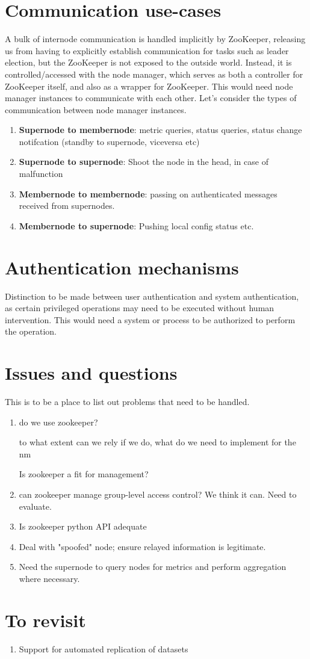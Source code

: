 \documentclass[oneside,12pt]{memoir}
\begin{document}
\section{Communication use-cases}
\label{commcases}
A bulk of internode communication is handled implicitly by ZooKeeper, releasing us from having to explicitly establish communication for tasks such as leader election, but the ZooKeeper is not exposed to the outside world. Instead, it is controlled/accessed with the node manager, which serves as both a controller for ZooKeeper itself, and also as a wrapper for ZooKeeper. This would need node manager instances to communicate with each other. Let's consider the types of communication between node manager instances.
\begin{enumerate}
\item \textbf{Supernode to membernode}: metric queries, status queries, status change notifcation (standby to supernode, viceversa etc)
\item \textbf{Supernode to supernode}: Shoot the node in the head, in case of malfunction
\item \textbf{Membernode to membernode}: passing on authenticated messages received from supernodes.
\item \textbf{Membernode to supernode}: Pushing local config status etc.
\end{enumerate}

\section{Authentication mechanisms}
Distinction to be made between user authentication and system authentication, as certain privileged operations may need to be executed without human intervention. This would need a system or process to be authorized to perform the operation. 
\section{Issues and questions}
This is to be a place to list out problems that need to be handled.
\begin{enumerate}
\item
do we use zookeeper?

to what extent can we rely if we do,  what do we need to implement for the nm


Is zookeeper a fit for management?
\item
can zookeeper manage group-level access control?  We think it can.  Need to evaluate.
\item
Is zookeeper python API adequate

\item
Deal with "spoofed" node; ensure relayed information is legitimate. 
\item
Need the supernode to query nodes for metrics and perform aggregation where necessary.

\end{enumerate}
\section{To revisit}
\begin{enumerate}
\item Support for automated replication of datasets
\end{enumerate}
\printbibliography
\hypertarget{mymarker}{}
\printindex
\end{document}
